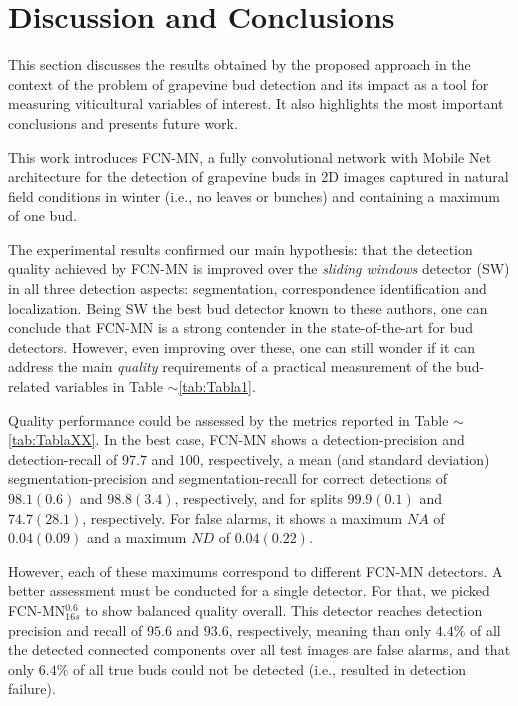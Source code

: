 \documentclass[a4paper,authoryear,review]{elsarticle}
\begin{document}
\section{Discussion and Conclusions}
\label{sec:discussion}

This section discusses the results obtained by the proposed approach in the context of the problem of grapevine bud detection and its impact as a tool for measuring viticultural variables of interest. It also highlights the most important conclusions and presents future work. 

This work introduces FCN-MN, a fully convolutional network with Mobile Net architecture for the detection of grapevine buds in 2D images captured in natural field conditions in winter (i.e., no leaves or bunches) and containing a maximum of one bud.

The experimental results confirmed our main hypothesis: that the detection quality achieved by FCN-MN is improved over the \emph{sliding windows} detector (SW) in all three detection aspects: segmentation, correspondence identification and localization. Being SW the best bud detector known to these authors, one can conclude that FCN-MN is a strong contender in the state-of-the-art for bud detectors. However, even improving over these, one can still wonder if it can address the main \emph{quality} requirements of a practical measurement of the bud-related variables in Table $\sim$\ref{tab:Tabla1}.

Quality performance could be assessed by the metrics reported in Table $\sim$\ref{tab:TablaXX}. In the best case, FCN-MN shows a  detection-precision and detection-recall of $97.7$ and $100$, respectively, a mean (and standard deviation) segmentation-precision and segmentation-recall for correct detections of $98.1(0.6)$ and $98.8(3.4)$, respectively, and for splits $99.9(0.1)$ and $74.7(28.1)$, respectively. For false alarms, it shows a maximum  $NA$ of $0.04(0.09)$ and a maximum $ND$ of $0.04 (0.22)$.  

However, each of these maximums correspond to different FCN-MN detectors. A better assessment must be conducted for a single detector. For that, we picked FCN-MN$_{16s}^{0.6}$ to show balanced quality overall. This detector reaches detection precision and recall of $95.6$ and $93.6$, respectively, meaning than only $4.4\%$ of all the detected connected components over all test images are false alarms, and that only $6.4\%$ of all true buds could not be detected (i.e., resulted in detection failure).
\end{document}
